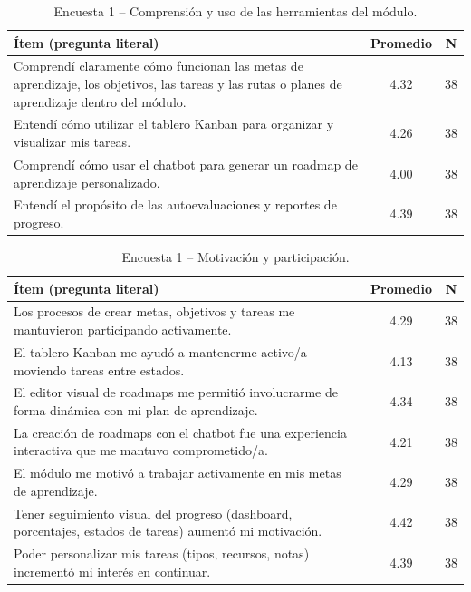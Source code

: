 \begin{table}[H]
\centering
\footnotesize
\setlength{\tabcolsep}{4pt}
\renewcommand{\arraystretch}{1.35}
\begin{tabular}{|p{10.5cm}|c|c|}
\hline
\textbf{Ítem (pregunta literal)} & \textbf{Promedio} & \textbf{N} \\
\hline
Comprendí claramente cómo funcionan las metas de aprendizaje, los objetivos, las tareas y las rutas o planes de aprendizaje dentro del módulo. & 4.32 & 38 \\
\hline
Entendí cómo utilizar el tablero Kanban para organizar y visualizar mis tareas. & 4.26 & 38 \\
\hline
Comprendí cómo usar el chatbot para generar un roadmap de aprendizaje personalizado. & 4.00 & 38 \\
\hline
Entendí el propósito de las autoevaluaciones y reportes de progreso. & 4.39 & 38 \\
\hline
\end{tabular}
\caption{Encuesta 1 – Comprensión y uso de las herramientas del módulo.}
\label{tab:anexo-aaa-comprension}
\end{table}

\begin{table}[H]
\centering
\footnotesize
\setlength{\tabcolsep}{4pt}
\renewcommand{\arraystretch}{1.35}
\begin{tabular}{|p{10.5cm}|c|c|}
\hline
\textbf{Ítem (pregunta literal)} & \textbf{Promedio} & \textbf{N} \\
\hline
Los procesos de crear metas, objetivos y tareas me mantuvieron participando activamente. & 4.29 & 38 \\
\hline
El tablero Kanban me ayudó a mantenerme activo/a moviendo tareas entre estados. & 4.13 & 38 \\
\hline
El editor visual de roadmaps me permitió involucrarme de forma dinámica con mi plan de aprendizaje. & 4.34 & 38 \\
\hline
La creación de roadmaps con el chatbot fue una experiencia interactiva que me mantuvo comprometido/a. & 4.21 & 38 \\
\hline
El módulo me motivó a trabajar activamente en mis metas de aprendizaje. & 4.29 & 38 \\
\hline
Tener seguimiento visual del progreso (dashboard, porcentajes, estados de tareas) aumentó mi motivación. & 4.42 & 38 \\
\hline
Poder personalizar mis tareas (tipos, recursos, notas) incrementó mi interés en continuar. & 4.39 & 38 \\
\hline
\end{tabular}
\caption{Encuesta 1 – Motivación y participación.}
\label{tab:anexo-aaa-motivacion}
\end{table}

